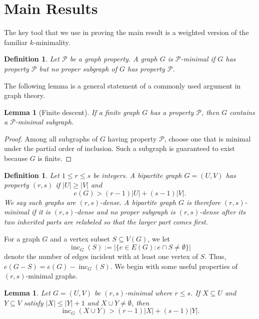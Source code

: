 \documentclass[10pt,a4paper]{amsart}
\newtheorem{lemma}[theorem]{Lemma}
\newtheorem{definition}[theorem]{Definition}
\newcommand{\inc}{\operatorname{inc}}
\begin{document}
\section{Main Results}
\label{sec:main}
The key tool that we use in proving the main result is a weighted version of the familiar $k$-minimality.

\begin{definition}
Let $\mathcal P$ be a graph property. A graph $G$ is \emph{$\mathcal P$-minimal} if $G$ has property $\mathcal P$ but no proper subgraph of $G$ has property $\mathcal P$.
\end{definition}

The following lemma is a general statement of a commonly used argument in graph theory.
\begin{lemma}[Finite descent]\label{lem:finite-descent}
If a finite graph $G$ has a property $\mathcal P$, then $G$ contains a $\mathcal P$-minimal subgraph.
\end{lemma}
\begin{proof}
Among all subgraphs of $G$ having property $\mathcal P$, choose one that is minimal under the partial order of inclusion. Such a subgraph is guaranteed to exist because $G$ is finite.
\end{proof}





\begin{definition}\label{def:weighted-minimality}
Let $1\le r\le s$ be integers. A bipartite graph $G=(U,V)$ has property \emph{$(r,s)$} if $|U|\ge |V|$ and
\[
    e(G)>(r-1)|U|+(s-1)|V|.
\]
We say such graphs are \emph{$(r,s)$}-dense.
A bipartite graph $G$ is therefore \emph{$(r,s)$-minimal} if it is $(r,s)$-dense and no proper subgraph is $(r,s)$-dense after its two inherited parts are relabeled so that the larger part comes first.
\end{definition}

\noindent For a graph $G$ and a vertex subset $S\subseteq V(G)$, we  let
\[
    \inc_G(S):=\bigl|\{e\in E(G):e\cap S\ne\emptyset\}\bigr|
\]
denote the number of edges incident with at least one vertex of $S$. Thus, $e(G-S)=e(G)-\inc_G(S)$. We begin with some useful properties of $(r,s)$-minimal graphs.
\begin{lemma}
\label{lem:incidence}
Let $G=(U,V)$ be $(r,s)$-minimal where $r\leq s$. If $X\subseteq U$ and $Y\subseteq V$ satisfy $|X|\le |Y|+1$ and $X\cup Y\not=\emptyset$, then
\[
    \inc_G(X\cup Y)>(r-1)|X|+(s-1)|Y|.
\]
\end{lemma}
\end{document}
